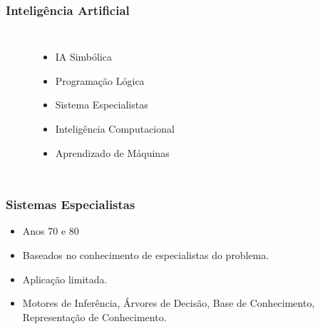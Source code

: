 \documentclass[aspectratio=169,12pt]{beamer}
\begin{document}
{%
\begin{frame}
    \frametitle{Inteligência \hfill\hfill \linebreak Artificial}
\begin{columns}
    \column{\dimexpr 0.6\paperwidth-10pt}
    $\;$
    \column{\dimexpr 0.5\paperwidth-10pt}

    \bfseries \begin{itemize}
        \setlength\itemsep{1em}
        \item \color{black} IA Simbólica
        \item Programação Lógica
        \item Sistema Especialistas
        \item Inteligência Computacional
        \item Aprendizado de Máquinas
    \end{itemize}

\end{columns}
\end{frame}
}

\begin{frame}
    \frametitle{Sistemas Especialistas}
    \begin{itemize}
        \setlength\itemsep{1em}
        \item Anos 70 e 80
        \item Baseados no conhecimento de especialistas do problema.
        \item Aplicação limitada.
        \item Motores de Inferência, Árvores de Decisão, Base de
        Conhecimento, Representação de Conhecimento.
    \end{itemize}
\end{frame}
\end{document}
